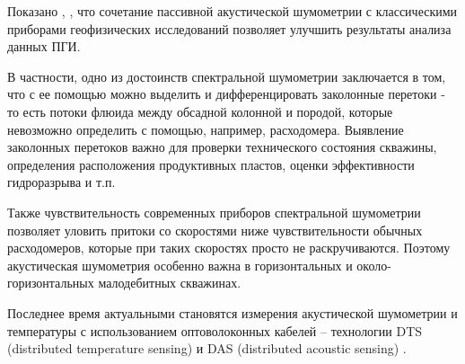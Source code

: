 \par
Показано \cite{pa_good}, \cite{187909}, что сочетание пассивной акустической шумометрии с классическими приборами геофизических исследований позволяет улучшить результаты анализа данных ПГИ. 
\par
В частности, одно из достоинств спектральной шумометрии заключается в том, что с ее помощью можно выделить и дифференцировать заколонные перетоки - то есть потоки флюида между обсадной колонной и породой, которые невозможно определить с помощью, например, расходомера. Выявление заколонных перетоков важно для проверки технического состояния скважины, определения расположения продуктивных пластов, оценки эффективности гидроразрыва и т.п.
\par
Также чувствительность современных приборов спектральной шумометрии позволяет уловить притоки со скоростями ниже чувствительности обычных расходомеров, которые при таких скоростях просто не раскручиваются. Поэтому акустическая шумометрия особенно важна в горизонтальных и около-горизонтальных малодебитных скважинах.
\par
Последнее время актуальными становятся измерения акустической шумометрии и температуры с использованием оптоволоконных кабелей – технологии DTS (distributed temperature sensing) и DAS (distributed acoustic sensing) \cite{161712}.

